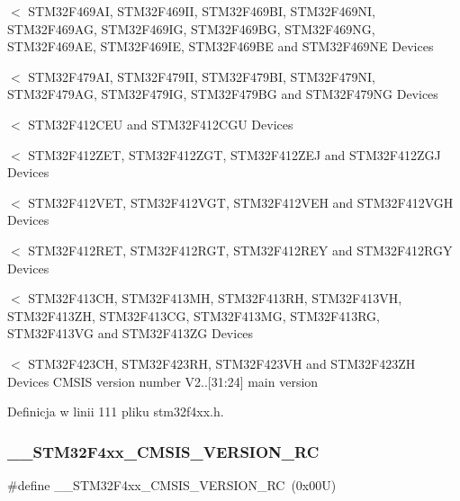$<$ S\+T\+M32\+F469\+AI, S\+T\+M32\+F469\+II, S\+T\+M32\+F469\+BI, S\+T\+M32\+F469\+NI, S\+T\+M32\+F469\+AG, S\+T\+M32\+F469\+IG, S\+T\+M32\+F469\+BG, S\+T\+M32\+F469\+NG, S\+T\+M32\+F469\+AE, S\+T\+M32\+F469\+IE, S\+T\+M32\+F469\+BE and S\+T\+M32\+F469\+NE Devices

$<$ S\+T\+M32\+F479\+AI, S\+T\+M32\+F479\+II, S\+T\+M32\+F479\+BI, S\+T\+M32\+F479\+NI, S\+T\+M32\+F479\+AG, S\+T\+M32\+F479\+IG, S\+T\+M32\+F479\+BG and S\+T\+M32\+F479\+NG Devices

$<$ S\+T\+M32\+F412\+C\+EU and S\+T\+M32\+F412\+C\+GU Devices

$<$ S\+T\+M32\+F412\+Z\+ET, S\+T\+M32\+F412\+Z\+GT, S\+T\+M32\+F412\+Z\+EJ and S\+T\+M32\+F412\+Z\+GJ Devices

$<$ S\+T\+M32\+F412\+V\+ET, S\+T\+M32\+F412\+V\+GT, S\+T\+M32\+F412\+V\+EH and S\+T\+M32\+F412\+V\+GH Devices

$<$ S\+T\+M32\+F412\+R\+ET, S\+T\+M32\+F412\+R\+GT, S\+T\+M32\+F412\+R\+EY and S\+T\+M32\+F412\+R\+GY Devices

$<$ S\+T\+M32\+F413\+CH, S\+T\+M32\+F413\+MH, S\+T\+M32\+F413\+RH, S\+T\+M32\+F413\+VH, S\+T\+M32\+F413\+ZH, S\+T\+M32\+F413\+CG, S\+T\+M32\+F413\+MG, S\+T\+M32\+F413\+RG, S\+T\+M32\+F413\+VG and S\+T\+M32\+F413\+ZG Devices

$<$ S\+T\+M32\+F423\+CH, S\+T\+M32\+F423\+RH, S\+T\+M32\+F423\+VH and S\+T\+M32\+F423\+ZH Devices C\+M\+S\+IS version number V2..\mbox{[}31\+:24\mbox{]} main version 

Definicja w linii 111 pliku stm32f4xx.\+h.

\mbox{\label{group___library__configuration__section_gafbd304f122892833ce0d4daa3dc4ff13}} 
\subsubsection{\texorpdfstring{\+\_\+\+\_\+\+S\+T\+M32\+F4xx\+\_\+\+C\+M\+S\+I\+S\+\_\+\+V\+E\+R\+S\+I\+O\+N\+\_\+\+RC}{\_\_STM32F4xx\_CMSIS\_VERSION\_RC}}
{\footnotesize\ttfamily \#define \+\_\+\+\_\+\+S\+T\+M32\+F4xx\+\_\+\+C\+M\+S\+I\+S\+\_\+\+V\+E\+R\+S\+I\+O\+N\+\_\+\+RC~(0x00\+U)}

